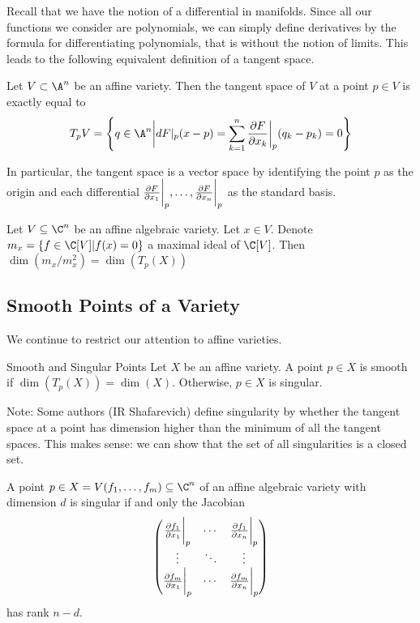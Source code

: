 \documentclass[a4paper]{article}
\begin{document}
Recall that we have the notion of a differential in manifolds. Since all our functions we consider are polynomials, we can simply define derivatives by the formula for differentiating polynomials, that is without the notion of limits. This leads to the following equivalent definition of a tangent space. 

\begin{prp}{}{} Let $V\subset\A^n$ be an affine variety. Then the tangent space of $V$ at a point $p\in V$ is exactly equal to $$T_pV=\left\{q\in\A^n\bigg{|}dF|_p(x-p)=\sum_{k=1}^n\frac{\partial F}{\partial x_k}\bigg{|}_p(q_k-p_k)=0\right\}$$
\end{prp}

In particular, the tangent space is a vector space by identifying the point $p$ as the origin and each differential $\frac{\partial F}{\partial x_1}\bigg{|}_p,\dots,\frac{\partial F}{\partial x_n}\bigg{|}_p$ as the standard basis. 

\begin{prp}{}{} Let $V\subseteq\C^n$ be an affine algebraic variety. Let $x\in V$. Denote $m_x=\{f\in\C[V]|f(x)=0\}$ a maximal ideal of $\C[V]$. Then $\dim(m_x/m_x^2)=\dim(T_p(X))$
\end{prp}

\subsection{Smooth Points of a Variety}
We continue to restrict our attention to affine varieties. 

\begin{defn}{Smooth and Singular Points}{} Let $X$ be an affine variety. A point $p\in X$ is smooth if $\dim(T_p(X))=\dim(X)$. Otherwise, $p\in X$ is singular. 
\end{defn}

Note: Some authors (IR Shafarevich) define singularity by whether the tangent space at a point has dimension higher than the minimum of all the tangent spaces. This makes sense: we can show that the set of all singularities is a closed set. 

\begin{prp}{}{} A point $p\in X=V(f_1,\dots,f_m)\subseteq\C^n$ of an affine algebraic variety with dimension $d$ is singular if and only the Jacobian $$\begin{pmatrix}
\frac{\partial f_1}{\partial x_1}\bigg{|}_p & \cdots & \frac{\partial f_1}{\partial x_n}\bigg{|}_p\\
\vdots & \ddots & \vdots\\
\frac{\partial f_m}{\partial x_1}\bigg{|}_p & \cdots & \frac{\partial f_m}{\partial x_n}\bigg{|}_p
\end{pmatrix}$$
has rank $n-d$. 
\end{prp}
\end{document}
